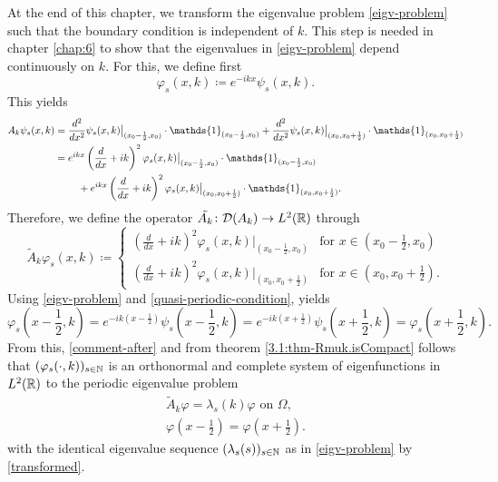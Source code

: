 At the end of this chapter, we transform the eigenvalue problem \eqref{eigv-problem} such that the boundary condition is independent of $k$. This step is needed in chapter \ref{chap:6} to show that the eigenvalues in \ref{eigv-problem} depend continuously on $k$. For this, we define first
	\[ \varphi_{s}(x, k) \coloneqq e^{-ikx} \psi_{s}(x, k). \]
This yields
	\begin{align}
		A_{k} \psi_{s}(x, k) & = \frac{d^{2}}{dx^{2}} \psi_{s}(x, k)\big|_{(x_{0} - \frac{1}{2}, x_{0})} \cdot \mathds{1}_{(x_{0} - \frac{1}{2}, x_{0})} + \frac{d^{2}}{dx^{2}} \psi_{s}(x, k)\big|_{(x_{0}, x_{0}  + \frac{1}{2})} \cdot \mathds{1}_{(x_{0}, x_{0} + \frac{1}{2})} \notag \\
			& = e^{ikx} \left( \frac{d}{dx} + ik \right)^{2} \varphi_{s}(x, k)\big|_{(x_{0} - \frac{1}{2}, x_{0})} \cdot \mathds{1}_{(x_{0} - \frac{1}{2}, x_{0})} \notag \\
			& ~\qquad + e^{ikx} \left( \frac{d}{dx} + ik \right)^{2} \varphi_{s}(x, k)\big|_{(x_{0}, x_{0}  + \frac{1}{2})} \cdot \mathds{1}_{(x_{0}, x_{0} + \frac{1}{2})}. \label{transformed}
	\end{align}
Therefore, we define the operator $\tilde{A_{k}} \colon \mathcal{D}(A_{k}) \rightarrow L^{2}(\mathbb{R})$ through  %
	\[ \tilde{A}_{k} \varphi_{s}(x, k) \coloneqq \begin{cases}
		\left( \frac{d}{dx} + ik \right)^{2} \varphi_{s}(x, k)|_{(x_{0} - \frac{1}{2}, x_{0})} & \text{for } x \in (x_{0} - \frac{1}{2}, x_{0}) \\ \left( \frac{d}{dx} + ik \right)^{2} \varphi_{s}(x, k)|_{(x_{0}, x_{0}  + \frac{1}{2})} & \text{for } x \in (x_{0}, x_{0} + \frac{1}{2}).
	\end{cases} \] 
Using \eqref{eigv-problem} and \eqref{quasi-periodic-condition}, yields
	\[ \varphi_{s}\left(x - \frac{1}{2}, k\right) = e^{-ik(x - \frac{1}{2})} \psi_{s}\left(x - \frac{1}{2}, k\right) = e^{-ik(x + \frac{1}{2})} \psi_{s}\left(x + \frac{1}{2}, k\right) = \varphi_{s}\left(x + \frac{1}{2}, k\right). \]
From this, \eqref{comment-after} and from theorem \ref{3.1:thm-Rmuk.isCompact} follows that $(\varphi_{s}(\cdot, k))_{s \in \mathbb{N}}$ is an orthonormal and complete system of eigenfunctions in $L^{2}(\mathbb{R})$ to the periodic eigenvalue problem
	\begin{align}
		\tilde{A}_{k} \varphi = \lambda_{s}(k) \varphi \text{ on } \Omega, \label{mod-eigv-problem} \\
		\varphi\left(x - \frac{1}{2}\right) = \varphi\left(x + \frac{1}{2}\right). \label{periodic-condition}
	\end{align}
with the identical eigenvalue sequence $(\lambda_{s}(s))_{s \in \mathbb{N}}$ as in \eqref{eigv-problem} by \eqref{transformed}.